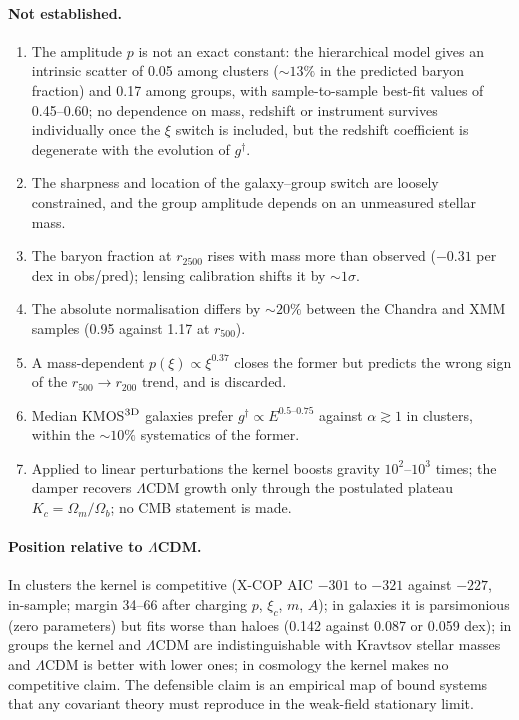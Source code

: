 \documentclass[11pt,a4paper]{article}
\newcommand{\gdag}{g^{\dagger}}
\begin{document}
\paragraph{Not established.}
\begin{enumerate}[leftmargin=2em,itemsep=0.1em]
\item The amplitude $p$ is not an exact constant: the hierarchical model gives an intrinsic scatter of 0.05 among clusters ($\sim13\%$ in the predicted baryon fraction) and 0.17 among groups, with sample-to-sample best-fit values of 0.45--0.60; no dependence on mass, redshift or instrument survives individually once the $\xi$ switch is included, but the redshift coefficient is degenerate with the evolution of $\gdag$.
\item The sharpness and location of the galaxy--group switch are loosely constrained, and the group amplitude depends on an unmeasured stellar mass.
\item The baryon fraction at $r_{2500}$ rises with mass more than observed ($-0.31$ per dex in obs/pred); lensing calibration shifts it by $\sim1\sigma$.
\item The absolute normalisation differs by $\sim20\%$ between the Chandra and XMM samples (0.95 against 1.17 at $r_{500}$).
\item A mass-dependent $p(\xi)\propto\xi^{0.37}$ closes the former but predicts the wrong sign of the $r_{500}\to r_{200}$ trend, and is discarded.
\item Median KMOS$^{\rm 3D}$ galaxies prefer $\gdag\propto E^{0.5\text{--}0.75}$ against $\alpha\gtrsim1$ in clusters, within the $\sim10\%$ systematics of the former.
\item Applied to linear perturbations the kernel boosts gravity $10^2$--$10^3$ times; the damper recovers $\Lambda$CDM growth only through the postulated plateau $K_c=\Omega_m/\Omega_b$; no CMB statement is made.
\end{enumerate}

\paragraph{Position relative to $\Lambda$CDM.} In clusters the kernel is competitive (X-COP AIC $-301$ to $-321$ against $-227$, in-sample; margin 34--66 after charging $p$, $\xi_c$, $m$, $A$); in galaxies it is parsimonious (zero parameters) but fits worse than haloes (0.142 against 0.087 or 0.059 dex); in groups the kernel and $\Lambda$CDM are indistinguishable with Kravtsov stellar masses and $\Lambda$CDM is better with lower ones; in cosmology the kernel makes no competitive claim. The defensible claim is an empirical map of bound systems that any covariant theory must reproduce in the weak-field stationary limit.
\end{document}
